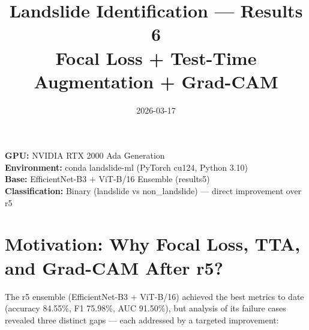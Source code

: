 \documentclass[11pt]{article}
\title{Landslide Identification --- Results 6 \\ \large Focal Loss + Test-Time Augmentation + Grad-CAM}
\author{}
\date{2026-03-17}
\begin{document}
\maketitle

\noindent\textbf{GPU:} NVIDIA RTX 2000 Ada Generation \\
\textbf{Environment:} conda landslide-ml (PyTorch cu124, Python 3.10) \\
\textbf{Base:} EfficientNet-B3 + ViT-B/16 Ensemble (results5) \\
\textbf{Classification:} Binary (landslide vs non\_landslide) --- direct improvement over r5

\section{Motivation: Why Focal Loss, TTA, and Grad-CAM After r5?}

The r5 ensemble (EfficientNet-B3 + ViT-B/16) achieved the best metrics to date (accuracy 84.55\%, F1 75.98\%, AUC 91.50\%), but analysis of its failure cases revealed three distinct gaps --- each addressed by a targeted improvement:
\end{document}
